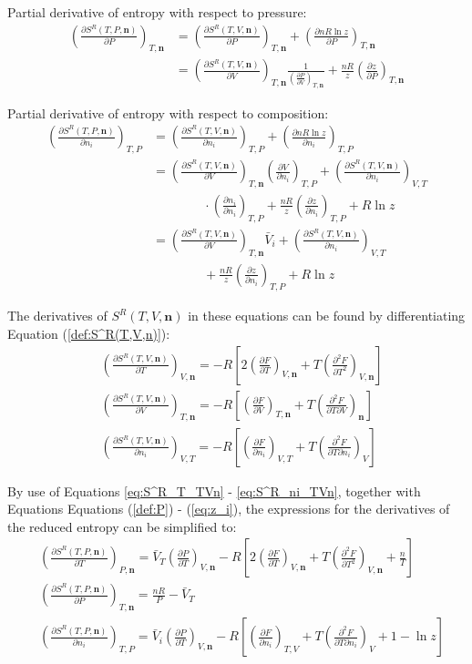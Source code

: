 \documentclass[english]{../thermomemo/thermomemo}
\numberwithin{equation}{section}
\newcommand*{\pder}[2]{\left(\frac{\partial #1}{\partial #2}\right)}
\newcommand*{\pdder}[2]{\left(\frac{\partial^2 #1}{\partial #2^2}\right)}
\newcommand*{\pdcross}[3]{\left(\frac{\partial^2 #1}{\partial #2 \partial #3}\right)}
\newcommand*{\reff}[1]{(\ref{#1})}
\begin{document}
Partial derivative of entropy with respect to pressure:
\begin{equation}
\begin{split}
\left( \frac{\partial S^R(T,P,\textbf{n})}{\partial P} \right)_{T,\textbf{n}}
& = \left( \frac{\partial S^R(T,V, \textbf{n})}{\partial P} \right)_{T,\textbf{n}} + \left( \frac{\partial nR \ln z}{\partial P} \right)_{T,\textbf{n}} \\
& = \pder{S^R(T,V,\textbf{n})}{V}_{T,\textbf{n}} \frac{1}{\pder{P}{V}_{T,\textbf{n}}} + \frac{nR}{z} \pder{z}{P}_{T,\textbf{n}}
\end{split}
\end{equation}

Partial derivative of entropy with respect to composition:
\begin{equation}
\begin{split}
\left( \frac{\partial S^R(T,P,\textbf{n})}{\partial n_i} \right)_{T,P}
& = \left( \frac{\partial S^R(T,V, \textbf{n})}{\partial n_i} \right)_{T,P} + \left( \frac{\partial nR \ln z}{\partial n_i} \right)_{T,P} \\
& = \pder{S^R(T,V,\textbf{n})}{V}_{T,\textbf{n}} \pder{V}{n_i}_{T,P} + \pder{S^R(T,V,\textbf{n})}{n_i}_{V,T} \\
& \qquad \qquad \cdot \pder{n_i}{n_i}_{T,P} + \frac{nR}{z} \pder{z}{n_i}_{T,P} + R \ln z\\
& = \pder{S^R(T,V,\textbf{n})}{V}_{T,\textbf{n}} \bar{V}_i + \pder{S^R(T,V,\textbf{n})}{n_i}_{V,T} \\
& \qquad \qquad  + \frac{nR}{z} \pder{z}{n_i}_{T,P} + R \ln z
\end{split}
\end{equation}

The derivatives of $S^R(T,V,\textbf{n})$ in these equations can be found by differentiating Equation \reff{def:S^R(T,V,n)}:
\begin{align}
\label{eq:S^R_T_TVn}
& \pder{S^R(T,V,\textbf{n})}{T}_{V,\textbf{n}} = -R \left[2 \pder{F}{T}_{V,\textbf{n}} + T\pdder{F}{T}_{V,\textbf{n}} \right] \\
& \pder{S^R(T,V,\textbf{n})}{V}_{T,\textbf{n}} = -R \left[\pder{F}{V}_{T,\textbf{n}} + T \pdcross{F}{T}{V}_\textbf{n} \right] \\ 
\label{eq:S^R_ni_TVn}
& \pder{S^R(T,V,\textbf{n})}{n_i}_{V,T} = -R \left[\pder{F}{n_i}_{V,T} + T \pdcross{F}{T}{n_i}_V \right]
\end{align}
 
By use of Equations \ref{eq:S^R_T_TVn} - \ref{eq:S^R_ni_TVn}, together with Equations Equations \reff{def:P} - \reff{eq:z_i}, the expressions for the derivatives of the reduced entropy can be simplified to:
\begin{align}
& \pder{S^R(T,P,\textbf{n})}{T}_{P,\textbf{n}} = \bar{V}_T \pder{P}{T}_{V,\textbf{n}} - R \left[2\pder{F}{T}_{V,\textbf{n}} + T \pdder{F}{T}_{V,\textbf{n}} + \frac{n}{T} \right] \\
& \pder{S^R(T,P,\textbf{n})}{P}_{T,\textbf{n}} = \frac{nR}{P} - \bar{V}_T \\
& \pder{S^R(T,P,\textbf{n})}{n_i}_{T,P} = \bar{V}_i \pder{P}{T}_{V,\textbf{n}} - R\left[ \pder{F}{n_i}_{T,V} + T\pdcross{F}{T}{n_i}_V + 1 - \ln z \right] 
\end{align}
\end{document}

